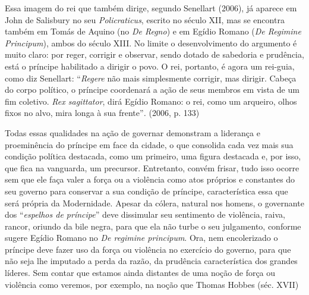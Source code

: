 Essa imagem do rei que também dirige, segundo Senellart (2006), já
aparece em John de Salisbury no seu \emph{Policraticus}, escrito no
século XII, mas se encontra também em Tomás de Aquino (no \emph{De
Regno}) e em Egídio Romano (\emph{De Regimine Principum}), ambos do
século XIII. No limite o desenvolvimento do argumento é muito claro: por
reger, corrigir e observar, sendo dotado de sabedoria e prudência, está
o príncipe habilitado a dirigir o povo. O rei, portanto, é agora um
rei-guia, como diz Senellart: ``\emph{Regere} não mais simplesmente
corrigir, mas dirigir. Cabeça do corpo político, o príncipe coordenará a
ação de seus membros em vista de um fim coletivo. \emph{Rex sagittator},
dirá Egídio Romano: o rei, como um arqueiro, olhos fixos no alvo, mira
longa à sua frente''\emph{.} (2006, p. 133)

Todas essas qualidades na ação de governar demonstram a liderança e
proeminência do príncipe em face da cidade, o que consolida cada vez
mais sua condição política destacada, como um primeiro, uma figura
destacada e, por isso, que fica na vanguarda, um precursor. Entretanto,
convém frisar, tudo isso ocorre sem que ele faça valer a força ou a
violência como atos próprios e constantes do seu governo para conservar
a sua condição de príncipe, característica essa que será própria da
Modernidade. Apesar da cólera, natural nos homens, o governante dos
``\emph{espelhos de príncipe}'' deve dissimular seu sentimento de
violência, raiva, rancor, oriundo da bile negra, para que ela não turbe
o seu julgamento, conforme sugere Egídio Romano no \emph{De regimine
principum}. Ora, nem encolerizado o príncipe deve fazer uso da força ou
violência no exercício do governo, para que não seja lhe imputado a
perda da razão, da prudência característica dos grandes líderes. Sem
contar que estamos ainda distantes de uma noção de força ou violência
como veremos, por exemplo, na noção que Thomas Hobbes (séc. XVII)
